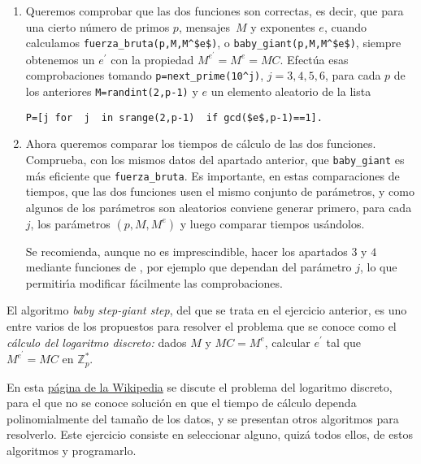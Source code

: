 \begin{ejer}
\begin{enumerate}
\item Queremos comprobar que las dos funciones son correctas, es decir, que
para una cierto n\'umero de primos $p$,  mensajes~$M$ y exponentes $e$, cuando
calculamos \lstinline|fuerza_bruta(p,M,M^$e$)|, o
\lstinline|baby_giant(p,M,M^$e$)|, siempre obtenemos un $e^{\prime}$ con la
propiedad
$M^{e^{\prime}}=M^e=MC$.  Efect\'ua esas comprobaciones tomando 
\lstinline$p=next_prime(10^j)$, $j=3,4,5,6$, para cada $p$ de los anteriores
\lstinline$M=randint(2,p-1)$ y $e$  un elemento aleatorio de la lista 
\begin{lstlisting}
P=[j for  j  in srange(2,p-1)  if gcd($e$,p-1)==1].
\end{lstlisting}

\item  Ahora queremos comparar los tiempos de c\'alculo de las dos funciones.
Comprueba, con los mismos datos del apartado anterior, que
\lstinline|baby_giant| es m\'as
eficiente que \lstinline|fuerza_bruta|.  Es importante, en estas comparaciones
de
tiempos, que las dos funciones usen el mismo conjunto de par\'ametros, y como
algunos de los par\'ametros son aleatorios conviene generar primero,  para cada
$j$, los par\'ametros $(p,M,M^e)$  y luego comparar tiempos us\'andolos.

Se recomienda, aunque no es imprescindible,  hacer los apartados $3$ y $4$
mediante funciones de {\sage}, por ejemplo que dependan del  par\'ametro $j$, 
lo que
permitir\'{\i}a modificar f\'acilmente las comprobaciones.
\end{enumerate}
\end{ejer}



\begin{ejer}

El algoritmo {\itshape baby step-giant step}, del que se trata en el ejercicio 
anterior, es uno entre varios de los propuestos para resolver el problema que 
se conoce como el {\itshape c\'alculo del logaritmo discreto:}  dados $M$ y 
$MC=M^{e}$,  calcular $e^\prime$
tal que $M^{e^{\prime}}=MC$ en $\mathbb{Z}_{p}^{*}$. 

En esta  
\href{http://en.wikipedia.org/wiki/Discrete_logarithm}{p\'agina de la 
Wikipedia} se discute el problema del logaritmo discreto, para el que no se 
conoce  soluci\'on en que el tiempo de c\'alculo dependa 
polinomialmente del  tama\~no de los datos, y se presentan otros  algoritmos 
para resolverlo. Este ejercicio consiste en seleccionar alguno, quiz\'a todos 
ellos,  de estos algoritmos y programarlo. 

\end{ejer}

